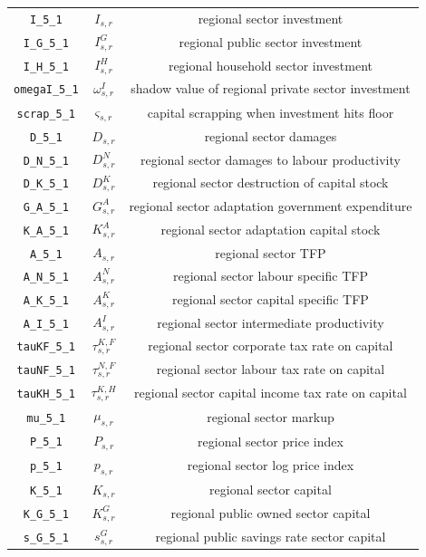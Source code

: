 \begin{center}
\begin{longtable}{ccc}
\texttt{I\_5\_1} & ${I_{s,r}}$ & regional sector investment\\
\texttt{I\_G\_5\_1} & ${I^G_{s,r}}$ & regional public sector investment\\
\texttt{I\_H\_5\_1} & ${I^H_{s,r}}$ & regional household sector investment\\
\texttt{omegaI\_5\_1} & ${\omega^I_{s,r}}$ & shadow value of regional private sector investment\\
\texttt{scrap\_5\_1} & ${\varsigma_{s,r}}$ & capital scrapping when investment hits floor\\
\texttt{D\_5\_1} & ${D_{s,r}}$ & regional sector damages\\
\texttt{D\_N\_5\_1} & ${D^N_{s,r}}$ & regional sector damages to labour productivity\\
\texttt{D\_K\_5\_1} & ${D^K_{s,r}}$ & regional sector destruction of capital stock\\
\texttt{G\_A\_5\_1} & ${G^{A}_{s,r}}$ & regional sector adaptation government expenditure\\
\texttt{K\_A\_5\_1} & ${K^{A}_{s,r}}$ & regional sector adaptation capital stock\\
\texttt{A\_5\_1} & ${A_{s,r}}$ & regional sector TFP\\
\texttt{A\_N\_5\_1} & ${A^{N}_{s,r}}$ & regional sector labour specific TFP\\
\texttt{A\_K\_5\_1} & ${A^{K}_{s,r}}$ & regional sector capital specific TFP\\
\texttt{A\_I\_5\_1} & ${A^{I}_{s,r}}$ & regional sector intermediate productivity\\
\texttt{tauKF\_5\_1} & ${\tau^{K,F}_{s,r}}$ & regional sector corporate tax rate on capital\\
\texttt{tauNF\_5\_1} & ${\tau^{N,F}_{s,r}}$ & regional sector labour tax rate on capital\\
\texttt{tauKH\_5\_1} & ${\tau^{K,H}_{s,r}}$ & regional sector capital income tax rate on capital\\
\texttt{mu\_5\_1} & ${\mu_{s,r}}$ & regional sector markup\\
\texttt{P\_5\_1} & ${P_{s,r}}$ & regional sector price index\\
\texttt{p\_5\_1} & ${p_{s,r}}$ & regional sector log price index\\
\texttt{K\_5\_1} & ${K_{s,r}}$ & regional sector capital\\
\texttt{K\_G\_5\_1} & ${K^G_{s,r}}$ & regional public owned sector capital\\
\texttt{s\_G\_5\_1} & ${s^G_{s,r}}$ & regional public savings rate sector capital\\

\end{longtable}
\end{center}
